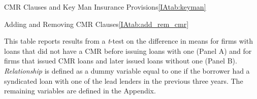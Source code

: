 \documentclass[12pt]{article}
\begin{document}
\begin{appendices}
\begin{singlespace}
\begin{papertable}{CMR Clauses and Key Man Insurance Provisions}{\ref{IAtab:keyman}}{}
  \startdata
  
\end{papertable}


\begin{papertable}{Adding and Removing CMR Clauses}{\ref{IAtab:add_rem_cmr}}{}
    \label{IAtab:add_rem_cmr}

    This table reports results from a \textit{t}-test on the difference in means for firms with loans that did not have a CMR before issuing loans with one (Panel A) and for firms that issued CMR loans and later issued loans without one (Panel B).
    \textit{Relationship} is defined as a dummy variable equal to one if the borrower had a syndicated loan with one of the lead lenders in the previous three years.
    The remaining variables are defined in the Appendix.
    \postamblesig

    \startdata
    
\end{papertable}



\end{singlespace}

\end{appendices}
\end{document}
